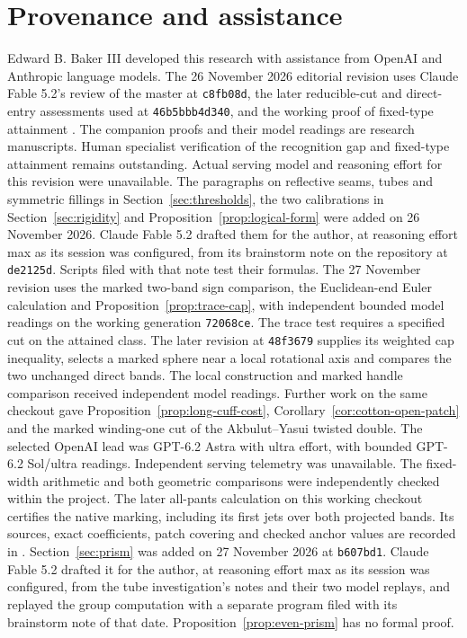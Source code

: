 \documentclass[11pt,letterpaper]{article}
\numberwithin{equation}{section}
\begin{document}
\section*{Provenance and assistance}
Edward B. Baker III developed this research with assistance from OpenAI
and Anthropic language models. The 26 November 2026 editorial revision
uses Claude Fable 5.2's review of the master at \texttt{c8fb08d}, the later
reducible-cut and direct-entry assessments used at \texttt{46b5bbb4d340},
and the working proof of fixed-type attainment
\cite{Baker2026BourAttainment}. The companion proofs and their model
readings are research manuscripts. Human specialist verification of the
recognition gap and fixed-type attainment remains outstanding. Actual
serving model and reasoning effort for this revision were unavailable.
The paragraphs on reflective seams, tubes and symmetric fillings in
Section~\ref{sec:thresholds}, the two calibrations in
Section~\ref{sec:rigidity} and Proposition~\ref{prop:logical-form}
were added on 26 November 2026. Claude Fable 5.2 drafted them for the
author, at reasoning effort max as its session was configured, from its
brainstorm note on the repository at \texttt{de2125d}. Scripts filed
with that note test their formulas. The 27 November revision uses the
marked two-band sign comparison, the Euclidean-end Euler calculation and
Proposition~\ref{prop:trace-cap}, with independent bounded model readings
on the working generation \texttt{72068ce}. The trace test requires a
specified cut on the attained class. The later revision at
\texttt{48f3679} supplies its weighted cap inequality, selects a
marked sphere near a local rotational axis and compares the two
unchanged direct bands. The local construction and marked handle
comparison received independent model readings. Further work on the
same checkout gave Proposition~\ref{prop:long-cuff-cost},
Corollary~\ref{cor:cotton-open-patch} and the marked winding-one
cut of the Akbulut--Yasui twisted double. The selected OpenAI lead
was GPT-6.2 Astra with ultra effort, with bounded GPT-6.2 Sol/ultra
readings. Independent serving telemetry was unavailable. The
fixed-width arithmetic and both geometric comparisons were
independently checked within the project. The later all-pants
calculation on this working checkout certifies the native marking,
including its first jets over both projected bands. Its sources,
exact coefficients, patch covering and checked anchor values are
recorded in \cite{Baker2026NativeMarking}.
Section~\ref{sec:prism} was added on 27 November 2026 at
\texttt{b607bd1}. Claude Fable 5.2 drafted it for the author, at
reasoning effort max as its session was configured, from the tube
investigation's notes and their two model replays, and replayed the
group computation with a separate program filed with its brainstorm
note of that date. Proposition~\ref{prop:even-prism} has no formal
proof.



\end{document}
